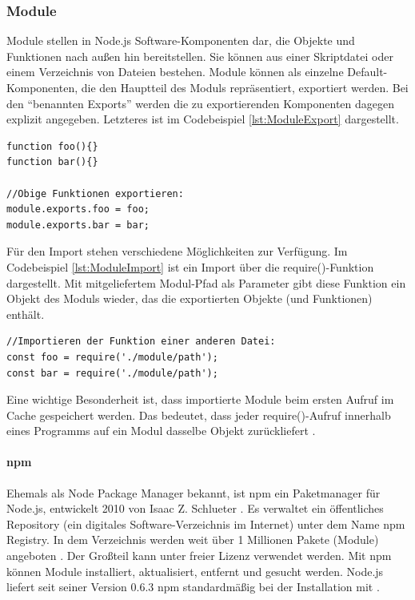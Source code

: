 \newpage
\subsubsection{Module}

\noindent
Module stellen in Node.js Software-Komponenten dar, die Objekte und Funktionen nach außen hin bereitstellen.
Sie können aus einer Skriptdatei oder einem Verzeichnis von Dateien bestehen. Module können als einzelne Default-Komponenten, die den Hauptteil des Moduls repräsentiert, exportiert werden. 
Bei den \enquote{benannten Exports} werden die zu exportierenden Komponenten dagegen explizit angegeben. Letzteres ist im Codebeispiel \ref{lst:ModuleExport} dargestellt.
\newline
  
    
\begin{lstlisting}[caption=Benannter Export von Modulen,label=lst:ModuleExport]
function foo(){}
function bar(){}

//Obige Funktionen exportieren:
module.exports.foo = foo;
module.exports.bar = bar;
\end{lstlisting}


\noindent
Für den Import stehen verschiedene Möglichkeiten zur Verfügung.
Im Codebeispiel \ref{lst:ModuleImport} ist ein Import über die require()-Funktion dargestellt.
Mit mitgeliefertem Modul-Pfad als Parameter gibt diese Funktion ein Objekt des Moduls wieder, das die exportierten Objekte (und Funktionen) enthält.
\newline
  
\begin{lstlisting}[caption=Import von Modulen,label=lst:ModuleImport]
//Importieren der Funktion einer anderen Datei:
const foo = require('./module/path');
const bar = require('./module/path');
\end{lstlisting}

\noindent
Eine wichtige Besonderheit ist, dass importierte Module beim ersten Aufruf im Cache gespeichert werden. 
Das bedeutet, dass jeder require()-Aufruf innerhalb eines Programms auf ein Modul dasselbe Objekt zurückliefert \cite{Node1.21}.


\paragraph{npm}
Ehemals als Node Package Manager bekannt, ist npm ein Paketmanager für Node.js, entwickelt 2010 von Isaac Z. Schlueter \cite{Node1.3}. Es verwaltet ein öffentliches Repository (ein digitales Software-Verzeichnis im Internet) unter dem Name npm Registry. In dem Verzeichnis werden weit über 1 Millionen Pakete (Module) angeboten \cite{Node1.4}. Der Großteil kann unter freier Lizenz verwendet werden. Mit npm können Module installiert, aktualisiert, entfernt und gesucht werden. Node.js liefert seit seiner Version 0.6.3 npm standardmäßig bei der Installation mit \cite{Node1.5}.

